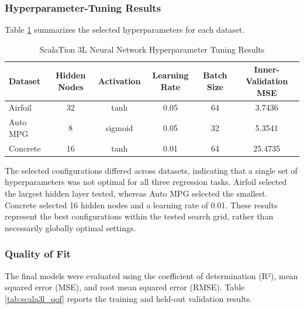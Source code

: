 \documentclass{article}
\begin{document}
\subsubsection{Hyperparameter-Tuning Results}
Table \ref{tab:scala3l_hyperparameters} summarizes the selected hyperparameters for each dataset.
\begin{table}[H]
    \centering
    \caption{ScalaTion 3L Neural Network Hyperparameter Tuning Results}
    \label{tab:scala3l_hyperparameters}
    \small
    \begin{tabular}{lccccc}
        \hline
        \textbf{Dataset} & \textbf{Hidden Nodes} & \textbf{Activation} & \textbf{Learning Rate} & \textbf{Batch Size} & \textbf{Inner-Validation MSE} \\
        \hline
        Airfoil  & 32 & tanh    & 0.05 & 64 & 3.7436 \\
        Auto MPG & 8  & sigmoid & 0.05 & 32 & 5.3541 \\
        Concrete & 16 & tanh    & 0.01 & 64 & 25.4735 \\
        \hline
    \end{tabular}
\end{table}

The selected configurations differed across datasets, indicating that a single set of hyperparameters was not optimal for all three regression tasks. Airfoil selected the largest hidden layer tested, whereas Auto MPG selected the smallest. Concrete selected 16 hidden nodes and a learning rate of 0.01. These results represent the best configurations within the tested search grid, rather than necessarily globally optimal settings.

\subsubsection{Quality of Fit}
The final models were evaluated using the coefficient of determination (R²), mean squared error (MSE), and root mean squared error (RMSE). Table \ref{tab:scala3l_qof} reports the training and held-out validation results.
\begin{table}[H]
    \centering
    \caption{ScalaTion 3L Neural Network Quality of Fit Results}
    \label{tab:scala3l_qof}
    \small
\end{table}
\end{document}
